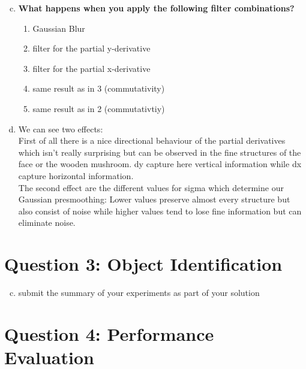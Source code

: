 \documentclass[12pt]{article}
\begin{document}
\begin{enumerate}[a)]
    \setcounter{enumi}{2}
    \item 
        \textbf{What happens when you apply the following filter combinations?}\\
        \begin{enumerate}[1.]
            \item 
                Gaussian Blur
            \item
                filter for the partial y-derivative
            \item
                filter for the partial x-derivative
            \item
                same result as in 3 (commutativity)
            \item 
                same result as in 2 (commutativtiy)
        \end{enumerate}

    \item
        We can see two effects:\\
        First of all there is a nice directional behaviour of the partial derivatives which isn't really surprising but can be observed in the fine structures of the face or the wooden mushroom. dy capture here vertical information while dx capture horizontal information.\\
        The second effect are the different values for sigma which determine our Gaussian presmoothing: Lower values preserve almost every structure but also consist of noise while higher values tend to lose fine information but can eliminate noise.
\end{enumerate}


\section*{Question 3: Object Identification}

\begin{enumerate}[a)]
    \setcounter{enumi}{2}
    \item 
        submit the summary of your experiments as part of your solution
\end{enumerate}


\newpage
\section*{Question 4: Performance Evaluation}
\end{document}
